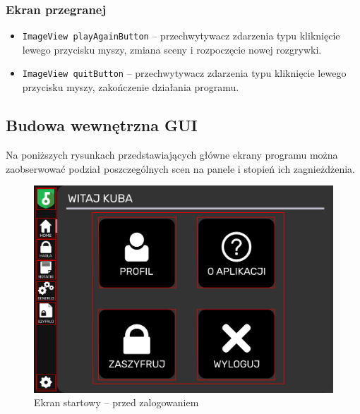 \documentclass[a4paper]{article}
\newcommand{\prog}{\texttt}
\begin{document}
\subsubsection{Ekran przegranej}
\begin{itemize}
    \item \prog{ImageView playAgainButton} -- przechwytywacz zdarzenia typu kliknięcie lewego przycisku myszy, zmiana sceny i rozpoczęcie nowej rozgrywki.
    \item \prog{ImageView quitButton} -- przechwytywacz zdarzenia typu kliknięcie lewego przycisku myszy, zakończenie działania programu.
\end{itemize}

\subsection{Budowa wewnętrzna GUI}
Na poniższych rysunkach przedstawiających główne ekrany programu można zaobserwować podział poszczególnych scen na panele i stopień ich zagnieżdżenia.
\begin{figure}[H]
    \centering
    \includegraphics[width=1\textwidth]{img/ekran_przed_zalogowanie.png}
    \caption{Ekran startowy -- przed zalogowaniem}
    \label{fig:startPrzed}
\end{figure}
\end{document}
